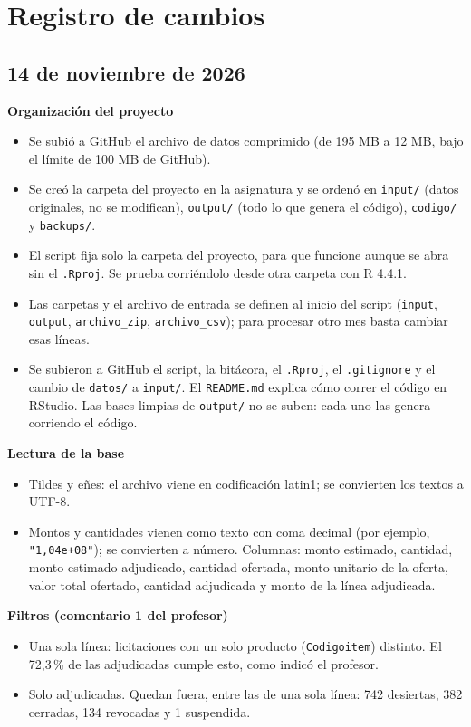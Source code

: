 \documentclass[11pt,a4paper]{article}
\newcommand{\cod}[1]{\texttt{#1}}
\begin{document}
\section{Registro de cambios}

\subsection{14 de noviembre de 2026}

\textbf{Organización del proyecto}
\begin{itemize}
  \item Se subió a GitHub el archivo de datos comprimido (de 195 MB a 12 MB, bajo el límite de 100 MB de GitHub).
  \item Se creó la carpeta del proyecto en la asignatura y se ordenó en \cod{input/} (datos originales, no se modifican), \cod{output/} (todo lo que genera el código), \cod{codigo/} y \cod{backups/}.
  \item El script fija solo la carpeta del proyecto, para que funcione aunque se abra sin el \cod{.Rproj}. Se prueba corriéndolo desde otra carpeta con R 4.4.1.
  \item Las carpetas y el archivo de entrada se definen al inicio del script (\cod{input}, \cod{output}, \cod{archivo\_zip}, \cod{archivo\_csv}); para procesar otro mes basta cambiar esas líneas.
  \item Se subieron a GitHub el script, la bitácora, el \cod{.Rproj}, el \cod{.gitignore} y el cambio de \cod{datos/} a \cod{input/}. El \cod{README.md} explica cómo correr el código en RStudio. Las bases limpias de \cod{output/} no se suben: cada uno las genera corriendo el código.
\end{itemize}

\textbf{Lectura de la base}
\begin{itemize}
  \item Tildes y eñes: el archivo viene en codificación latin1; se convierten los textos a UTF-8.
  \item Montos y cantidades vienen como texto con coma decimal (por ejemplo, \cod{"1,04e+08"}); se convierten a número. Columnas: monto estimado, cantidad, monto estimado adjudicado, cantidad ofertada, monto unitario de la oferta, valor total ofertado, cantidad adjudicada y monto de la línea adjudicada.
\end{itemize}

\textbf{Filtros (comentario 1 del profesor)}
\begin{itemize}
  \item Una sola línea: licitaciones con un solo producto (\cod{Codigoitem}) distinto. El 72,3\,\% de las adjudicadas cumple esto, como indicó el profesor.
  \item Solo adjudicadas. Quedan fuera, entre las de una sola línea: 742 desiertas, 382 cerradas, 134 revocadas y 1 suspendida.
\end{itemize}
\end{document}
